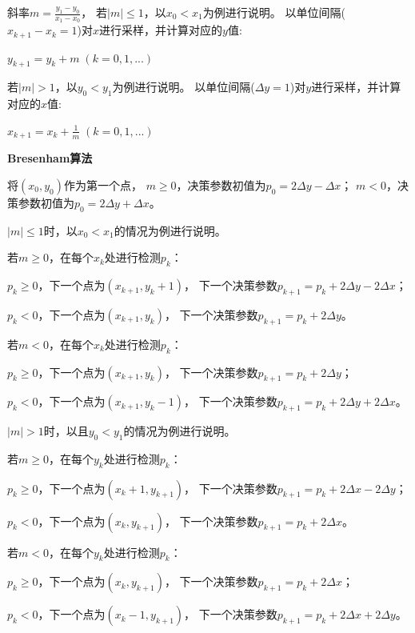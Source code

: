 \documentclass[a4paper,UTF8]{article}
\begin{document}
斜率$m=\frac{y_1-y_0}{x_1-x_0}$，
若$|m|\leqslant 1$，以$x_0<x_1$为例进行说明。
以单位间隔($x_{k+1}-x_k=1$)对$x$进行采样，并计算对应的$y$值:

$y_{k+1}=y_k+m\;(k=0,1,...)$

若$|m|>1$，以$y_0<y_1$为例进行说明。
以单位间隔($\Delta y=1$)对$y$进行采样，并计算对应的$x$值:

$x_{k+1}=x_k+\frac{1}{m}\;(k=0,1,...)$

\newpage
\textbf{Bresenham算法}

将$(x_0,y_0)$作为第一个点，
$m\geqslant 0$，决策参数初值为$p_0=2\Delta y-\Delta x$；
$m<0$，决策参数初值为$p_0=2\Delta y+\Delta x$。

$|m|\leqslant 1$时，以$x_0<x_1$的情况为例进行说明。

若$m\geqslant 0$，在每个$x_k$处进行检测$p_k$：

\hspace{2em}$p_k\geqslant 0$，下一个点为$(x_{k+1},y_{k}+1)$，
下一个决策参数$p_{k+1}=p_k+2\Delta y-2\Delta x$；

\hspace{2em}$p_k<0$，下一个点为$(x_{k+1},y_k)$，
下一个决策参数$p_{k+1}=p_k+2\Delta y$。

若$m<0$，在每个$x_k$处进行检测$p_k$：

\hspace{2em}$p_k\geqslant 0$，下一个点为$(x_{k+1},y_{k})$，
下一个决策参数$p_{k+1}=p_k+2\Delta y$；

\hspace{2em}$p_k<0$，下一个点为$(x_{k+1},y_{k}-1)$，
下一个决策参数$p_{k+1}=p_k+2\Delta y+2\Delta x$。


$|m|>1$时，以且$y_0<y_1$的情况为例进行说明。

若$m\geqslant 0$，在每个$y_k$处进行检测$p_k$：

\hspace{2em}$p_k\geqslant 0$，下一个点为$(x_{k}+1,y_{k+1})$，
下一个决策参数$p_{k+1}=p_k+2\Delta x-2\Delta y$；

\hspace{2em}$p_k<0$，下一个点为$(x_{k},y_{k+1})$，
下一个决策参数$p_{k+1}=p_k+2\Delta x$。

若$m<0$，在每个$y_k$处进行检测$p_k$：

\hspace{2em}$p_k\geqslant 0$，下一个点为$(x_{k},y_{k+1})$，
下一个决策参数$p_{k+1}=p_k+2\Delta x$；

\hspace{2em}$p_k<0$，下一个点为$(x_{k}-1,y_{k+1})$，
下一个决策参数$p_{k+1}=p_k+2\Delta x+2\Delta y$。
\end{document}
